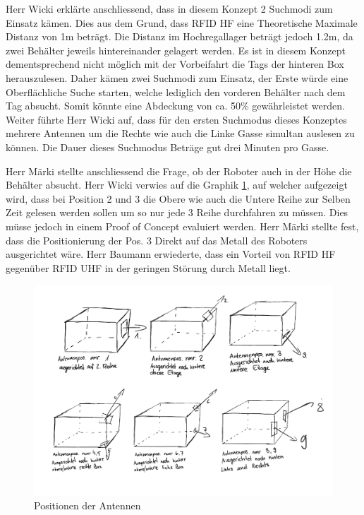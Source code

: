\documentclass[parskip=full, a4paper]{scrreprt}
\begin{document}
Herr Wicki erklärte anschliessend, dass in diesem Konzept 2 Suchmodi zum Einsatz kämen. Dies aus dem Grund, dass RFID HF eine Theoretische Maximale Distanz von 1m beträgt. Die Distanz im Hochregallager beträgt jedoch 1.2m, da zwei Behälter jeweils hintereinander gelagert werden. Es ist in diesem Konzept dementsprechend nicht möglich mit der Vorbeifahrt die Tags der hinteren Box herauszulesen. Daher kämen zwei Suchmodi zum Einsatz, der Erste würde eine Oberflächliche Suche starten, welche lediglich den vorderen Behälter nach dem Tag absucht. Somit könnte eine Abdeckung von ca. 50\% gewährleistet werden.
Weiter führte Herr Wicki auf, dass für den ersten Suchmodus dieses Konzeptes mehrere Antennen um die Rechte wie auch die Linke Gasse simultan auslesen zu können. Die Dauer dieses Suchmodus Beträge gut drei Minuten pro Gasse.

Herr Märki stellte anschliessend die Frage, ob der Roboter auch in der Höhe die Behälter absucht. Herr Wicki verwies auf die Graphik \ref{fig:antennenpos}, auf welcher aufgezeigt wird, dass bei Position 2 und 3 die Obere wie auch die Untere Reihe zur Selben Zeit gelesen werden sollen um so nur jede 3 Reihe durchfahren zu müssen. Dies müsse jedoch in einem Proof of Concept evaluiert werden.
Herr Märki stellte fest, dass die Positionierung der Pos. 3 Direkt auf das Metall des Roboters ausgerichtet wäre. Herr Baumann erwiederte, dass ein Vorteil von RFID HF gegenüber RFID UHF in der geringen Störung durch Metall liegt.

\begin{figure}
	\centering
	\includegraphics[keepaspectratio, width=0.8\linewidth]{images/Konzept_1_Drawings3.pdf}
	\caption{Positionen der Antennen}
	\label{fig:antennenpos}
\end{figure}
\end{document}
